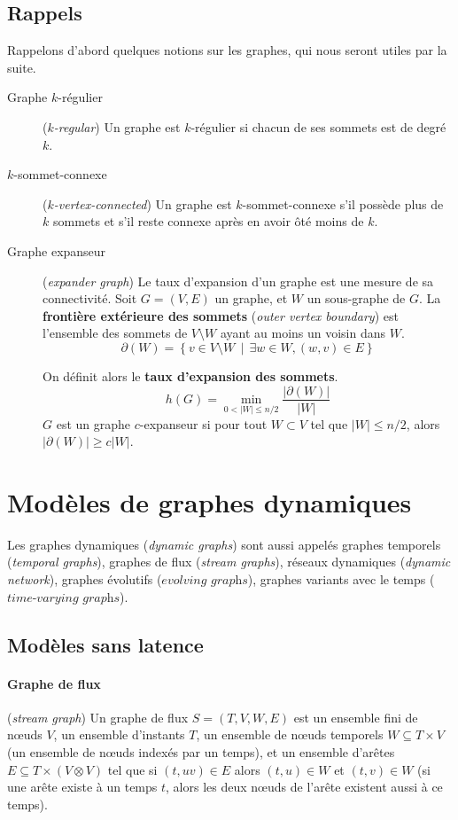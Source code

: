 \documentclass[12pt,a4paper]{article}
\begin{document}
\subsection{Rappels}
Rappelons d'abord quelques notions sur les graphes, qui nous seront
utiles par la suite.

\begin{description}
\item[Graphe \(k\)-régulier] (\textit{\(k\)-regular}) Un graphe est
  \(k\)-régulier si chacun de ses sommets est de degré \(k\).
\item[\(k\)-sommet-connexe] (\textit{\(k\)-vertex-connected}) Un
  graphe est \(k\)-sommet-connexe s'il possède plus de \(k\) sommets
  et s'il reste connexe après en avoir ôté moins de \(k\).
\item[Graphe expanseur] (\textit{expander graph}) Le taux d'expansion
  d'un graphe est une mesure de sa connectivité. Soit \(G = (V, E)\)
  un graphe, et \(W\) un sous-graphe de \(G\). La \textbf{frontière
    extérieure des sommets} (\textit{outer vertex boundary}) est
  l'ensemble des sommets de \(V \setminus W\) ayant au moins un voisin
  dans \(W\).
  \[\partial(W) = \left\{v \in V \setminus W \,\middle|\, \exists w
      \in W, (w, v) \in E\right\}\]

  On définit alors le \textbf{taux d'expansion des sommets}.
  \[h(G) = \min_{0 < |W| \leq n/2}\frac{|\partial(W)|}{|W|}\]
  \(G\) est un graphe \(c\)-expanseur si pour tout \(W \subset V\) tel
  que \(|W| \leq n / 2\), alors \(|\partial(W)| \geq c |W|\).
\end{description}

\section{Modèles de graphes dynamiques}

Les graphes dynamiques (\textit{dynamic graphs}) sont aussi appelés
graphes temporels (\textit{temporal graphs}), graphes de flux
(\textit{stream graphs}), réseaux dynamiques (\textit{dynamic
  network}), graphes évolutifs (\(\textit{evolving graphs}\)),
graphes variants avec le temps (\(\textit{time-varying graphs}\)).

\subsection{Modèles sans latence}

\paragraph{Graphe de flux}\cite{latapy2017stream} (\textit{stream
  graph}) Un graphe de flux \(S = (T, V, W, E)\) est un ensemble fini
de nœuds \(V\), un ensemble d'instants \(T\), un ensemble de nœuds
temporels \(W \subseteq T \times V\) (un ensemble de nœuds indexés par
un temps), et un ensemble d'arêtes
\(E \subseteq T \times (V \otimes V)\) tel que si \((t, uv) \in E\)
alors \((t, u) \in W\) et \((t, v) \in W\) (si une arête existe à un
temps \(t\), alors les deux nœuds de l'arête existent aussi à ce
temps).
\end{document}
